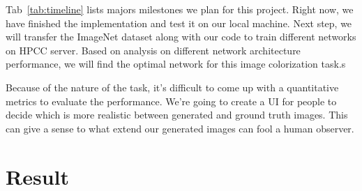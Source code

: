 \documentclass[10pt,twocolumn,letterpaper]{article}
\begin{document}
Tab~\ref{tab:timeline} lists majors milestones we plan for this project. Right now, we have finished the implementation and test it on our local machine. Next step, we will transfer the ImageNet dataset along with our code to train different networks on HPCC server. Based on analysis on different network architecture performance, we will find the optimal network for this image colorization task.s

Because of the nature of the task, it's difficult to come up with a quantitative metrics to evaluate the performance. We're going to create a UI for people to decide which is more realistic between generated and ground truth images. This can give a sense to what extend our generated images can fool a human observer.

\section{Result}
\end{document}
